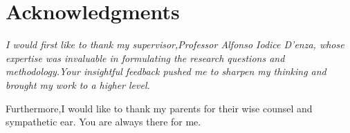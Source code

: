 
\cleardoublepage
\chapter{Acknowledgments}
\thispagestyle{empty}
\begin{flushright}
\itshape I would first like to thank my supervisor,Professor Alfonso Iodice D’enza, whose expertise was invaluable in formulating the research questions and methodology.Your insightful feedback pushed me to sharpen my thinking and brought my work to a higher level.

Furthermore,I would like to thank my parents for their wise counsel and sympathetic ear. You are always there for me.
\end{flushright}
\cleardoublepage

